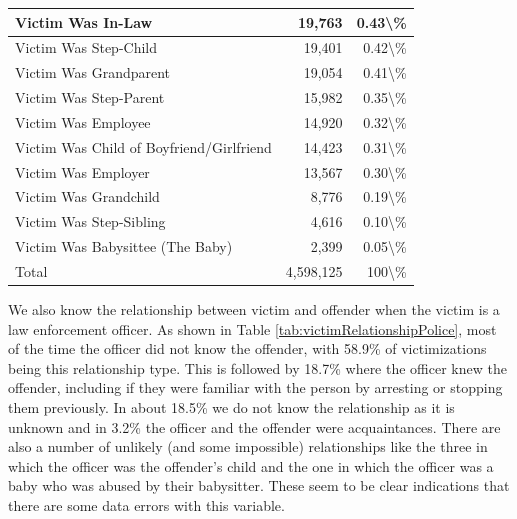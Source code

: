 \documentclass[
]{krantz}
\begin{document}
\begin{longtable}[t]{l|r|r}
\hline
Victim Was In-Law & 19,763 & 0.43\textbackslash{}\%\\
\hline
Victim Was Step-Child & 19,401 & 0.42\textbackslash{}\%\\
\hline
Victim Was Grandparent & 19,054 & 0.41\textbackslash{}\%\\
\hline
Victim Was Step-Parent & 15,982 & 0.35\textbackslash{}\%\\
\hline
Victim Was Employee & 14,920 & 0.32\textbackslash{}\%\\
\hline
Victim Was Child of Boyfriend/Girlfriend & 14,423 & 0.31\textbackslash{}\%\\
\hline
Victim Was Employer & 13,567 & 0.30\textbackslash{}\%\\
\hline
Victim Was Grandchild & 8,776 & 0.19\textbackslash{}\%\\
\hline
Victim Was Step-Sibling & 4,616 & 0.10\textbackslash{}\%\\
\hline
Victim Was Babysittee (The Baby) & 2,399 & 0.05\textbackslash{}\%\\
\hline
Total & 4,598,125 & 100\textbackslash{}\%\\
\hline
\end{longtable}

We also know the relationship between victim and offender
when the victim is a law enforcement officer. As shown in
Table \ref{tab:victimRelationshipPolice}, most of the time
the officer did not know the offender, with 58.9\% of
victimizations being this relationship type. This is
followed by 18.7\% where the officer knew the offender,
including if they were familiar with the person by arresting
or stopping them previously. In about 18.5\% we do not know
the relationship as it is unknown and in 3.2\% the officer
and the offender were acquaintances. There are also a number
of unlikely (and some impossible) relationships like the
three in which the officer was the offender's child and the
one in which the officer was a baby who was abused by their
babysitter. These seem to be clear indications that there
are some data errors with this variable.
\end{document}

